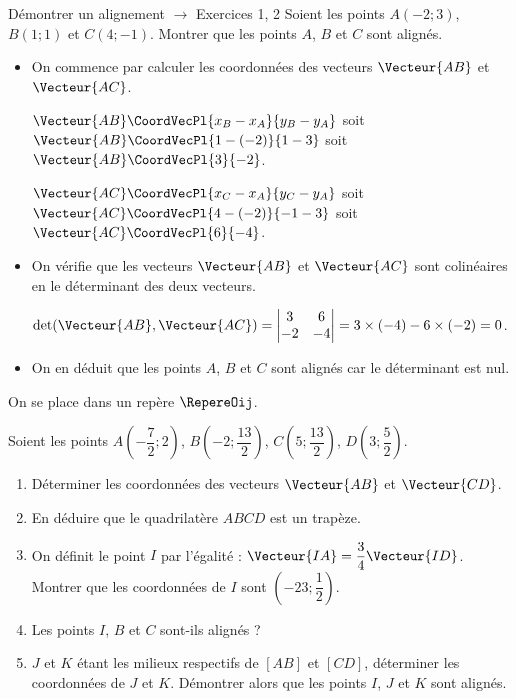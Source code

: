 \documentclass[a4paper]{article}
\begin{document}
\begin{methode*}[sidebyside, righthand width=2.2cm,segmentation code={}, sidebyside align=top]{Démontrer un alignement $\longrightarrow$ Exercices 1, 2}{}
Soient les points $A(-2; 3)$, $B(1; 1)$ et $C(4; -1)$. Montrer que les points $A$, $B$ et $C$ sont alignés.

  \begin{itemize}
    \item On commence par calculer les coordonnées des vecteurs $\Vecteur{AB}$ et $\Vecteur{AC}$.
    
    $\Vecteur{AB}\CoordVecPl{x_B-x_A}{y_B-y_A}$ soit $\Vecteur{AB}\CoordVecPl{1-(-2)}{1-3}$ soit $\Vecteur{AB}\CoordVecPl{3}{-2}$.

    $\Vecteur{AC}\CoordVecPl{x_C-x_A}{y_C-y_A}$ soit $\Vecteur{AC}\CoordVecPl{4-(-2)}{-1-3}$ soit $\Vecteur{AC}\CoordVecPl{6}{-4}$.

    \item On vérifie que les vecteurs $\Vecteur{AB}$ et $\Vecteur{AC}$ sont colinéaires en le déterminant des deux vecteurs.
    
    $\det(\Vecteur{AB},\Vecteur{AC})=\begin{vmatrix} 3 & 6 \\ -2 & -4 \end{vmatrix} = 3\times(-4)-6\times(-2)=0$.

    \item On en déduit que les points $A$, $B$ et $C$ sont alignés car le déterminant est nul.

  \end{itemize}
  
  \tcblower
  
  \vspace{3cm}


\end{methode*}


    \begin{exercice}{}{}
      On se place dans un repère $\RepereOij$.

      Soient les points $A(-\dfrac{7}{2}; 2)$, $B(-2; \dfrac{13}{2})$, $C(5; \dfrac{13}{2})$, $D(3; \dfrac{5}{2})$.
      
      \begin{enumerate}
          \item Déterminer les coordonnées des vecteurs $\Vecteur{AB}$ et $\Vecteur{CD}$.
          \item En déduire que le quadrilatère $ABCD$ est un trapèze.
          \item On définit le point $I$ par l'égalité : $\Vecteur{IA} = \dfrac{3}{4} \Vecteur{ID}$.
          Montrer que les coordonnées de $I$ sont $(-23; \dfrac{1}{2})$.
          \item Les points $I$, $B$ et $C$ sont-ils alignés ?
          \item $J$ et $K$ étant les milieux respectifs de $[AB]$ et $[CD]$, déterminer les coordonnées de $J$ et $K$.
          Démontrer alors que les points $I$, $J$ et $K$ sont alignés.
      \end{enumerate}
    \end{exercice}
\end{document}
